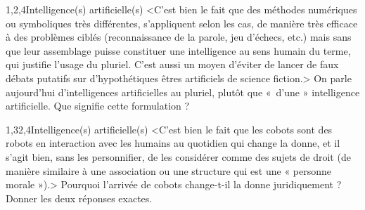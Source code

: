 \begin{quiz}[title={Robotique et intelligence artificielle}]
\vspace{-\baselineskip}
\begin{quizquestion*}[b]{3}{1,2,4}{Intelligence(s) artificielle(s)}
<C'est bien le fait que des méthodes numériques ou symboliques très différentes, s'appliquent selon les cas, de manière très efficace à des problèmes ciblés (reconnaissance de la parole, jeu d'échecs, etc.) mais sans que leur assemblage puisse constituer une intelligence au sens humain du terme, qui justifie l'usage du pluriel.
C'est aussi un moyen d'éviter de lancer de faux débats putatifs sur d'hypothétiques êtres artificiels de science fiction.>
On parle aujourd'hui d'intelligences artificielles au pluriel, plutôt que «~d'une » intelligence artificielle.
Que signifie cette formulation ?
\end{quizquestion*}

\begin{quizquestion}[b]{1,3}{2,4}{Intelligence(s) artificielle(s)}
<C'est bien le fait que les cobots sont des robots en interaction avec les humains au quotidien qui change la donne, et il s'agit bien, sans les personnifier, de les considérer comme des sujets de droit (de manière similaire à une association ou une structure qui est une « personne morale »).>
Pourquoi l'arrivée de cobots change-t-il la donne juridiquement ?
Donner les deux réponses exactes.
\end{quizquestion}


\end{quiz}
